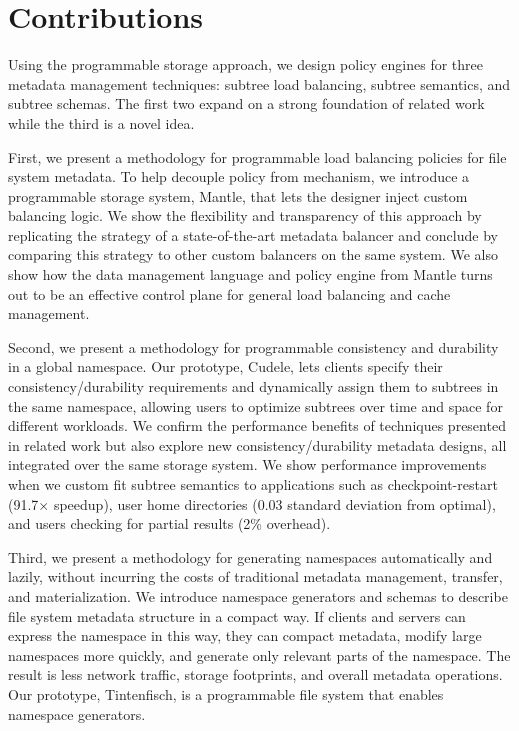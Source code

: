\section{Contributions}

Using the programmable storage approach, we design policy engines for three metadata
management techniques: subtree load balancing, subtree semantics, and subtree
schemas.  The first two expand on a strong foundation of related work while the
third is a novel idea. 

First, we present a methodology for programmable load balancing policies for
file system metadata.  To help decouple policy from mechanism, we introduce a
programmable storage system, Mantle, that lets the designer inject custom
balancing logic. We show the flexibility and transparency of this approach by
replicating the strategy of a state-of-the-art metadata balancer and conclude
by comparing this strategy to other custom balancers on the same system. We
also show how the data management language and policy engine from Mantle turns
out to be an effective control plane for general load balancing and cache
management.

Second, we present a methodology for programmable consistency and durability in
a global namespace. Our prototype, Cudele, lets clients specify their
consistency/durability requirements and dynamically assign them to subtrees in
the same namespace, allowing users to optimize subtrees over time and space for
different workloads. We confirm the performance benefits of techniques
presented in related work but also explore new consistency/durability metadata
designs, all integrated over the same storage system.  We show performance
improvements when we custom fit subtree semantics to applications such as
checkpoint-restart (91.7\(\times\) speedup), user home directories (0.03
standard deviation from optimal), and users checking for partial results (2\%
overhead).

Third, we present a methodology for generating namespaces automatically and
lazily, without incurring the costs of traditional metadata management,
transfer, and materialization.  We introduce namespace generators and schemas
to describe file system metadata structure in a compact way. If clients and
servers can express the namespace in this way, they can compact metadata,
modify large namespaces more quickly, and generate only relevant parts of the
namespace. The result is less network traffic, storage footprints, and overall
metadata operations.  Our prototype, Tintenfisch, is a programmable file system
that enables namespace generators.

